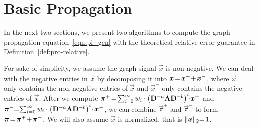\vspace{-2mm}
\section{Basic Propagation}
\vspace{-1mm}
\label{sec:BPA}
In the next two sections, we present two algorithms to compute the graph propagation equation~\eqref{eqn:pi_gen} with the theoretical relative error guarantee in Definition~\ref{def:pro-relative}.   

\vspace{-0.5mm}
For sake of simplicity, we assume the graph signal $\vec{x}$ is non-negative. We can deal with the negative entries in $\vec{x}$ by decomposing it into $\vec{x} \hspace{-0.5mm}=\hspace{-0.5mm} \vec{x}^{+} \hspace{-0.5mm}+\hspace{-0.5mm} \vec{x}^-$, where $\vec{x}^+$ only contains the non-negative entries of $\vec{x}$ and $\vec{x}^-$ only contains the negative entries of  $\vec{x}$. After we compute $\vec{\pi}^+\hspace{-0.5mm}=\hspace{-0.5mm}\sum_{i=0}^\infty w_i \cdot \left(\mathbf{D}^{-a}\mathbf{A} \mathbf{D}^{-b} \right)^i \hspace{-1mm} \cdot \hspace{-1mm}\vec{x}^+$ and $\vec{\pi}^{-}\hspace{-1mm}=\hspace{-1mm}\sum_{i=0}^\infty w_i \cdot \left(\mathbf{D}^{-a}\mathbf{A} \mathbf{D}^{-b} \right)^i\hspace{-0.5mm} \cdot\hspace{-0.5mm} \vec{x}^-$, we can combine  $\vec{\pi}^+$ and $\vec{\pi}^-$ to form $\vec{\pi}\hspace{-0.5mm} = \hspace{-0.5mm} \vec{\pi}^+ \hspace{-0.5mm}+\hspace{-0.5mm} \vec{\pi}^-$. We will also assume $\vec{x}$ is normalized, that is $\|\vec{x}\|_2 \hspace{-1mm}=\hspace{-0.5mm} 1$. 


